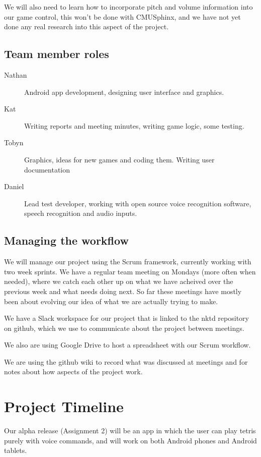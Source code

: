 \documentclass[11pt, oneside]{article}
\begin{document}
We will also need to learn how to incorporate pitch and volume
information into our game control, this won't be done with CMUSphinx,
and we have not yet done any real research into this aspect of the
project.


\subsection*{Team member roles}

\begin{description}
\item [Nathan] Android app development, designing user interface and
  graphics.
\item [Kat] Writing reports and meeting minutes, writing game logic,
  some testing.
\item [Tobyn] Graphics, ideas for new games and coding them. Writing
  user documentation
\item [Daniel] Lead test developer, working with open source voice
  recognition software, speech recognition and audio inputs.
\end{description}


\subsection*{Managing the workflow}

We will manage our project using the Scrum framework, currently
working with two week sprints. We have a regular team meeting on
Mondays (more often when needed), where we catch each other up on what
we have acheived over the previous week and what needs doing next. So
far these meetings have mostly been about evolving our idea of what we
are actually trying to make.

We have a Slack workspace for our project that is linked to the nktd
repository on github, which we use to communicate about the project
between meetings.

We also are using Google Drive to host a spreadsheet with our Scrum
workflow.

We are using the github wiki to record what was discussed at meetings
and for notes about how aspects of the project work.


\section*{Project Timeline}

Our alpha release (Assignment 2) will be an app in which the user can
play tetris purely with voice commands, and will work on both Android
phones and Android tablets.
\end{document}
